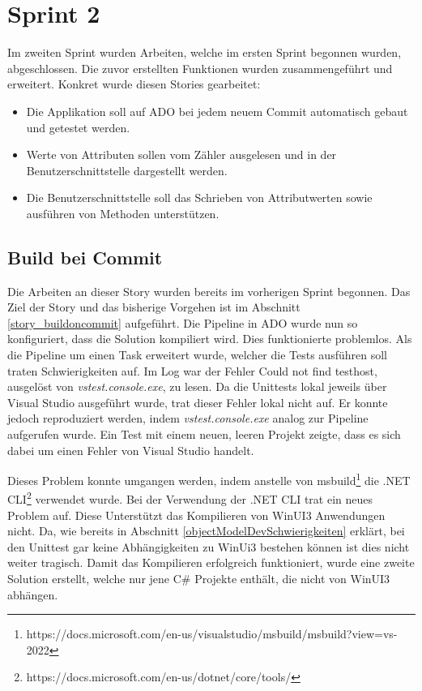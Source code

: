 \section{Sprint 2}
Im zweiten Sprint wurden Arbeiten, welche im ersten Sprint begonnen wurden, abgeschlossen.
Die zuvor erstellten Funktionen wurden zusammengeführt und erweitert.
Konkret wurde diesen Stories gearbeitet:
\begin{itemize}
   \item Die Applikation soll auf \ac{ADO} bei jedem neuem Commit automatisch gebaut und getestet werden. 
   \item Werte von Attributen sollen vom Zähler ausgelesen und in der Benutzerschnittstelle dargestellt werden.
   \item Die Benutzerschnittstelle soll das Schrieben von Attributwerten sowie ausführen von Methoden unterstützen.
\end{itemize}


\subsection{Build bei Commit}\label{s2:buildOnCommit}
Die Arbeiten an dieser Story wurden bereits im vorherigen Sprint begonnen.
Das Ziel der Story und das bisherige Vorgehen ist im Abschnitt \ref{story_buildoncommit} aufgeführt.
Die Pipeline in \ac{ADO} wurde nun so konfiguriert, dass die Solution kompiliert wird.
Dies funktionierte problemlos.
Als die Pipeline um einen Task erweitert wurde, welcher die Tests ausführen soll traten Schwierigkeiten auf.
Im Log war der Fehler \dq  Could not find testhost\dq , ausgelöst von \textit{vstest.console.exe}, zu lesen.
Da die Unittests lokal jeweils über Visual Studio ausgeführt wurde, trat dieser Fehler lokal nicht auf.
Er konnte jedoch reproduziert werden, indem \textit{vstest.console.exe} analog zur Pipeline aufgerufen wurde.
Ein Test mit einem neuen, leeren Projekt zeigte, dass es sich dabei um einen Fehler von Visual Studio handelt.

Dieses Problem konnte umgangen werden, indem anstelle von msbuild\footnote{https://docs.microsoft.com/en-us/visualstudio/msbuild/msbuild?view=vs-2022}
die .NET CLI\footnote{https://docs.microsoft.com/en-us/dotnet/core/tools/} verwendet wurde.
Bei der Verwendung der .NET CLI trat ein neues Problem auf.
Diese Unterstützt das Kompilieren von WinUI3 Anwendungen nicht.
Da, wie bereits in Abschnitt \ref{objectModelDevSchwierigkeiten} erklärt, bei den Unittest gar keine Abhängigkeiten zu WinUi3 bestehen können ist dies nicht weiter tragisch.
Damit das Kompilieren erfolgreich funktioniert, wurde eine zweite Solution erstellt, welche nur jene C\# Projekte enthält, die nicht von WinUI3 abhängen.

